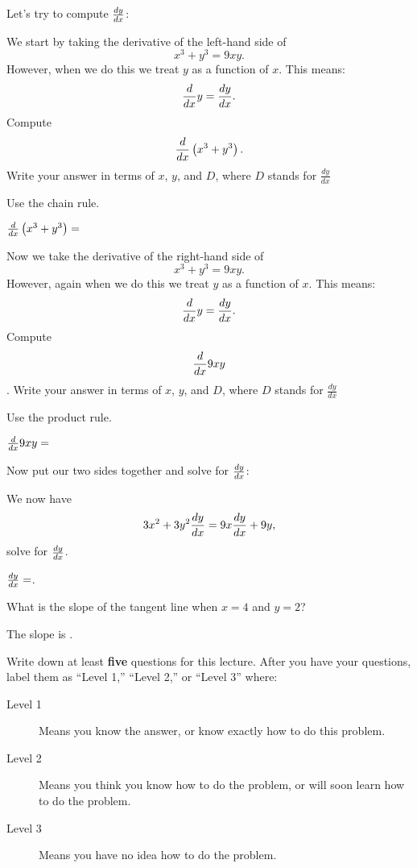 \documentclass{ximera}
\begin{document}
Let's try to compute $\frac{dy}{dx}$:


\begin{question}
We start by taking the derivative of the left-hand side of 
\[
x^3+y^3 = 9xy.
\]
However, when we do this we treat $y$ as a function of $x$. This means:
\[
\frac{d}{dx} y = \frac{dy}{dx}.
\]
Compute 
\[
\frac{d}{dx} \left(x^3+y^3\right).
\] Write your answer in terms of $x$, $y$, and $D$, where $D$ stands for $\frac{dy}{dx}$
\begin{hint}
Use the chain rule.
\end{hint}
\begin{prompt}
$\frac{d}{dx} \left(x^3+y^3\right) = $
\end{prompt}
\end{question}

\begin{question}
Now we take the derivative of the right-hand side of 
\[
x^3+y^3 = 9xy.
\]
However, again when we do this we treat $y$ as a function of $x$. This
means:
\[
\frac{d}{dx} y = \frac{dy}{dx}.
\]
Compute 
\[
\frac{d}{dx} 9xy
\]. Write your answer in terms of $x$, $y$, and $D$, where $D$ stands for $\frac{dy}{dx}$
\begin{hint}
Use the product rule.
\end{hint}
\begin{prompt}
$\frac{d}{dx} 9xy= $
\end{prompt}
\end{question}


\begin{question}
Now put our two sides together and solve for $\frac{dy}{dx}$:
\begin{hint}
We now have 
\[
3x^2 + 3y^2\frac{dy}{dx}= 9x\frac{dy}{dx} + 9y,
\]
solve for $\frac{dy}{dx}$.
\end{hint}
\begin{prompt}
$\frac{dy}{dx}=$.
\end{prompt}
\end{question}


\begin{question}
What is the slope of the tangent line when $x=4$ and $y=2$?
\begin{prompt}
The slope is .
\end{prompt}
\end{question}


\begin{question}
Write down at least \textbf{five} questions for this lecture. After
you have your questions, label them as ``Level 1,'' ``Level 2,'' or ``Level 3'' where:
\begin{description}
\item[Level 1] Means you know the answer, or know exactly how to do this problem.
\item[Level 2] Means you think you know how to do the problem, or will soon learn how to do the problem.
\item[Level 3] Means you have no idea how to do the problem. 
\end{description}
  \begin{freeResponse}
  \end{freeResponse}
\end{question}
\end{document}
